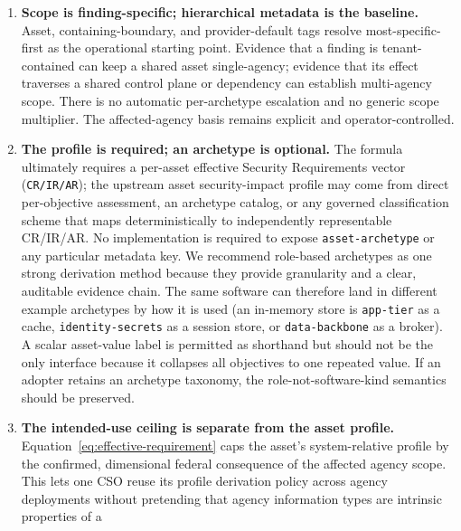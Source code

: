 \documentclass[11pt]{article}
\newcommand{\code}[1]{\texttt{#1}}
\newcommand{\rfckw}[1]{\textsc{#1}}
\begin{document}
\begin{enumerate}[leftmargin=1.7em]
  rate. Rationale: IRV means the attacker can re-deliver the exploit, and
  replication defends against uncorrelated failure, not a flaw every replica
  shares. An adopter \rfckw{may} tighten this (citation everywhere) or, at its
  own risk, relax the reachability carve-out; either choice belongs in governed
  configuration with the residual documented.
\item \textbf{Scope is finding-specific; hierarchical metadata is the baseline.}
  Asset, containing-boundary, and provider-default tags resolve most-specific-first
  as the operational starting point. Evidence that a finding is tenant-contained
  can keep a shared asset single-agency; evidence that its effect traverses a
  shared control plane or dependency can establish multi-agency scope. There is no
  automatic per-archetype escalation and no generic scope multiplier. The
  affected-agency basis remains explicit and operator-controlled.\par\smallskip
\item \textbf{The profile is required; an archetype is optional.} The formula
  ultimately requires a per-asset effective Security Requirements vector
  (\code{CR/IR/AR}); the upstream asset security-impact profile may come from direct
  per-objective assessment, an archetype catalog, or any governed classification
  scheme that maps deterministically to independently representable CR/IR/AR.
  No implementation is required to expose \code{asset-archetype} or any particular
  metadata key. We recommend role-based archetypes as one strong derivation method
  because they provide granularity and a clear, auditable evidence chain. The same
  software can therefore land in different example archetypes by how it is used
  (an in-memory store is \code{app-tier} as a cache,
  \code{identity-secrets} as a session store, or \code{data-backbone} as a broker).
  A scalar asset-value label is permitted as shorthand but should not be the only
  interface because it collapses all objectives to one repeated value. If an
  adopter retains an archetype taxonomy, the role-not-software-kind semantics
  should be preserved.
\item \textbf{The intended-use ceiling is separate from the asset profile.}
  Equation~\eqref{eq:effective-requirement} caps the asset's system-relative profile by
  the confirmed, dimensional federal consequence of the affected agency scope.
  This lets one CSO reuse its profile derivation policy across agency deployments without
  pretending that agency information types are intrinsic properties of a

\end{enumerate}
\end{document}
